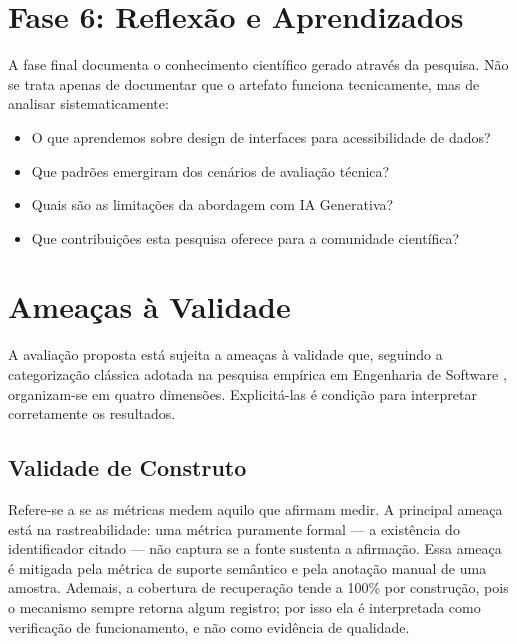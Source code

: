 \section{Fase 6: Reflexão e Aprendizados}

A fase final documenta o conhecimento científico gerado através da pesquisa. Não se trata apenas de documentar que o artefato funciona tecnicamente, mas de analisar sistematicamente:

\begin{itemize}
    \item O que aprendemos sobre design de interfaces para acessibilidade de dados?
    \item Que padrões emergiram dos cenários de avaliação técnica?
    \item Quais são as limitações da abordagem com IA Generativa?
    \item Que contribuições esta pesquisa oferece para a comunidade científica?
\end{itemize}

\section{Ameaças à Validade}

A avaliação proposta está sujeita a ameaças à validade que, seguindo a categorização clássica adotada na pesquisa empírica em Engenharia de Software \cite{Runeson2020}, organizam-se em quatro dimensões. Explicitá-las é condição para interpretar corretamente os resultados.

\subsection{Validade de Construto}
Refere-se a se as métricas medem aquilo que afirmam medir. A principal ameaça está na rastreabilidade: uma métrica puramente formal --- a existência do identificador citado --- não captura se a fonte sustenta a afirmação. Essa ameaça é mitigada pela métrica de suporte semântico e pela anotação manual de uma amostra. Ademais, a cobertura de recuperação tende a 100\% por construção, pois o mecanismo sempre retorna algum registro; por isso ela é interpretada como verificação de funcionamento, e não como evidência de qualidade.

